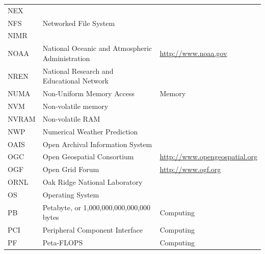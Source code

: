 \documentclass{../../template/esiwace-report}
\begin{document}
\begin{longtable}{|l|l|l|}
  NEX         &                                                       &                                       \\
  NFS         &       Networked File System                           &                                       \\
  NIMR        &                                                       &                                       \\
  NOAA        &         National Oceanic and Atmospheric Administration & \url{http://www.noaa.gov}                          \\
  NREN        &       National Research and Educational Network       &                                       \\
  NUMA        &         Non-Uniform Memory Access                     &         Memory                        \\
  NVM         &       Non-volatile memory                             &                                       \\
  NVRAM       &       Non-volatile RAM                                &                                       \\
  NWP         &       Numerical Weather Prediction                    &                                       \\
  OAIS        &       Open Archival Information System                &                                       \\
  OGC         &       Open Geospatial Consortium                      &       \url{http://www.opengeospatial.org}          \\
  OGF         &       Open Grid Forum                                 &       \url{http://www.ogf.org}                     \\
  ORNL        &       Oak Ridge National Laboratory                   &                                       \\
  OS          &       Operating System                                &                                       \\
  PB          &       Petabyte, or 1,000,000,000,000,000 bytes        &         Computing                     \\
  PCI         &         Peripheral Component Interface                &         Computing                     \\
  PF          &         Peta-FLOPS                                    &         Computing                     \\

\end{longtable}
\end{document}
